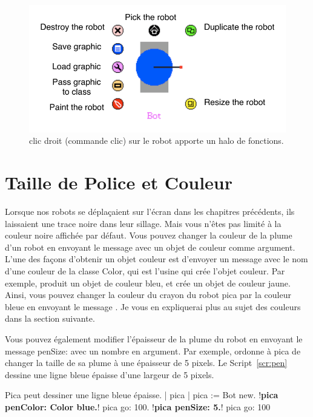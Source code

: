 \documentclass[a4paper,10pt,twoside]{book}
\begin{document}
\begin{figure}[h]
	\centerline{\includegraphics{picaAllHaloAnnotated}}
	\caption{clic droit (commande clic) sur le robot apporte un halo de fonctions. \label{fig:halos}}
\end{figure}


\section{Taille de Police et Couleur}

Lorsque nos robots se d\'eplaçaient sur l'\'ecran dans les chapitres pr\'ec\'edents, ils laissaient une 
trace noire dans leur sillage. Mais vous n'\^etes pas limit\'e \`a la couleur noire affich\'ee par d\'efaut. 
Vous pouvez changer la couleur de la plume d'un robot en envoyant le message   avec 
un objet de couleur comme argument. L'une des façons d'obtenir un objet couleur est d'envoyer un 
message avec le nom d'une couleur de la classe Color, qui est l'usine qui cr\'ee l'objet couleur. 
Par exemple,  produit un objet de couleur bleu, et   cr\'ee un objet 
de couleur jaune. Ainsi, vous pouvez changer la couleur du crayon du robot pica par la couleur 
bleue en envoyant le message . Je vous en expliquerai plus au sujet des 
couleurs dans la section suivante.

Vous pouvez \'egalement modifier l'\'epaisseur de la plume du robot en envoyant le message penSize: 
avec un nombre en argument. Par exemple,  ordonne \`a pica de changer la taille 
de sa plume \`a une \'epaisseur de 5 pixels. Le Script~\ref{scr:pen} dessine une ligne bleue \'epaisse 
d'une largeur de 5 pixels.


\begin{script}[pen]{Pica peut dessiner une ligne bleue \'epaisse.}
| pica | 
pica := Bot new. 
!\textbf{pica penColor: Color blue.}!
pica go: 100. 
!\textbf{pica penSize: 5.}!
pica go: 100 
\end{script}
\end{document}
